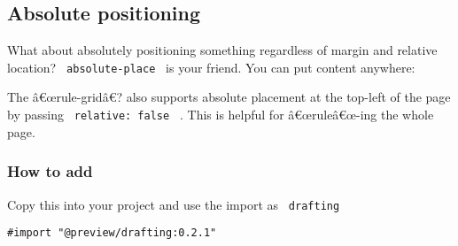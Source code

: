 
\subsection{Absolute positioning}\label{absolute-positioning}

What about absolutely positioning something regardless of margin and
relative location? \texttt{\ absolute-place\ } is your friend. You can
put content anywhere:

\begin{Shaded}
\begin{Highlighting}[]
\NormalTok{  )}
\NormalTok{    )}
\NormalTok{  )}
\NormalTok{\}}
\end{Highlighting}
\end{Shaded}


The â€œrule-gridâ€? also supports absolute placement at the top-left of
the page by passing \texttt{\ relative:\ false\ } . This is helpful for
â€œruleâ€œ-ing the whole page.

\subsubsection{How to add}\label{how-to-add}

Copy this into your project and use the import as \texttt{\ drafting\ }

\begin{verbatim}
#import "@preview/drafting:0.2.1"
\end{verbatim}



